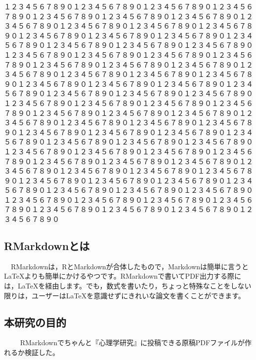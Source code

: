 \documentclass[11pt,a4paper,xelatex,ja=standard]{bxjsarticle}
\begin{document}
１２３４５６７８９０１２３４５６７８９０１２３４５６７８９０１２３４５６７８９０１２３４５６７８９０１２３４５６７８９０１２３４５６７８９０１２３４５６７８９０１２３４５６７８９０１２３４５６７８９０１２３４５６７８９０１２３４５６７８９０１２３４５６７８９０１２３４５６７８９０１２３４５６７８９０１２３４５６７８９０１２３４５６７８９０１２３４５６７８９０１２３４５６７８９０１２３４５６７８９０１２３４５６７８９０１２３４５６７８９０１２３４５６７８９０１２３４５６７８９０１２３４５６７８９０１２３４５６７８９０１２３４５６７８９０１２３４５６７８９０１２３４５６７８９０１２３４５６７８９０１２３４５６７８９０１２３４５６７８９０１２３４５６７８９０１２３４５６７８９０１２３４５６７８９０１２３４５６７８９０１２３４５６７８９０１２３４５６７８９０１２３４５６７８９０１２３４５６７８９０１２３４５６７８９０１２３４５６７８９０１２３４５６７８９０１２３４５６７８９０１２３４５６７８９０１２３４５６７８９０１２３４５６７８９０１２３４５６７８９０１２３４５６７８９０１２３４５６７８９０１２３４５６７８９０１２３４５６７８９０１２３４５６７８９０１２３４５６７８９０１２３４５６７８９０１２３４５６７８９０１２３４５６７８９０１２３４５６７８９０１２３４５６７８９０１２３４５６７８９０１２３４５６７８９０１２３４５６７８９０１２３４５６７８９０１２３４５６７８９０１２３４５６７８９０１２３４５６７８９０１２３４５６７８９０１２３４５６７８９０１２３４５６７８９０１２３４５６７８９０１２３４５６７８９０１２３４５６７８９０１２３４５６７８９０１２３４５６７８９０１２３４５６７８９０１２３４５６７８９０１２３４５６７８９０１２３４５６７８９０１２３４５６７８９０１２３４５６７８９０

\hypertarget{rmarkdownux3068ux306f}{%
\subsection{RMarkdownとは}\label{rmarkdownux3068ux306f}}

　RMarkdownは，RとMarkdownが合体したもので，Markdownは簡単に言うとLaTeXよりも簡単にかけるやつです。RMarkdownで書いてPDF出力する際には，LaTeXを経由します。でも，数式を書いたり，ちょっと特殊なことをしない限りは，ユーザーはLaTeXを意識せずにきれいな論文を書くことができます。

\hypertarget{ux672cux7814ux7a76ux306eux76eeux7684}{%
\subsection{本研究の目的}\label{ux672cux7814ux7a76ux306eux76eeux7684}}

　
　RMarkdownでちゃんと『心理学研究』に投稿できる原稿PDFファイルが作れるか検証した。
\end{document}
